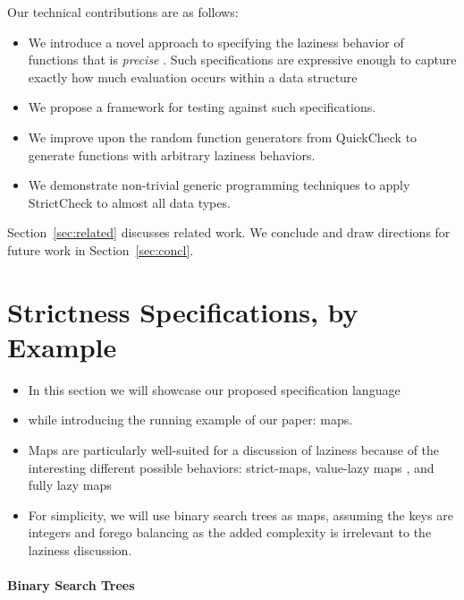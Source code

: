 \documentclass[acmsmall,review]{acmart}\settopmatter{}
\begin{document}
Our technical contributions are as follows:
\begin{itemize}
\item We introduce a novel approach to specifying the laziness behavior of functions that is
{\em precise} . Such specifications are
expressive enough to capture exactly how much evaluation occurs within
a data structure  
\item We propose a framework for testing against such specifications.
\item We improve upon the random function generators from QuickCheck to generate functions with arbitrary laziness behaviors.
\item We demonstrate non-trivial generic programming techniques to apply StrictCheck to almost all data types.
\end{itemize}
%
Section~\ref{sec:related} discusses related work. We conclude and draw
directions for future work in Section~\ref{sec:concl}.

\section{Strictness Specifications, by Example}
\label{sec:quickchick}


\begin{itemize}
\item In this section we will showcase our proposed specification language 
\item while introducing the running example of our paper: maps.
\item Maps are particularly well-suited for a discussion of laziness because of the interesting different
possible behaviors: strict-maps, value-lazy maps , and fully lazy maps
\item For simplicity, we will use binary search trees as maps, assuming the keys are integers and forego balancing
as the added complexity is irrelevant to the laziness discussion. 
\end{itemize}

\paragraph*{Binary Search Trees}
\end{document}
